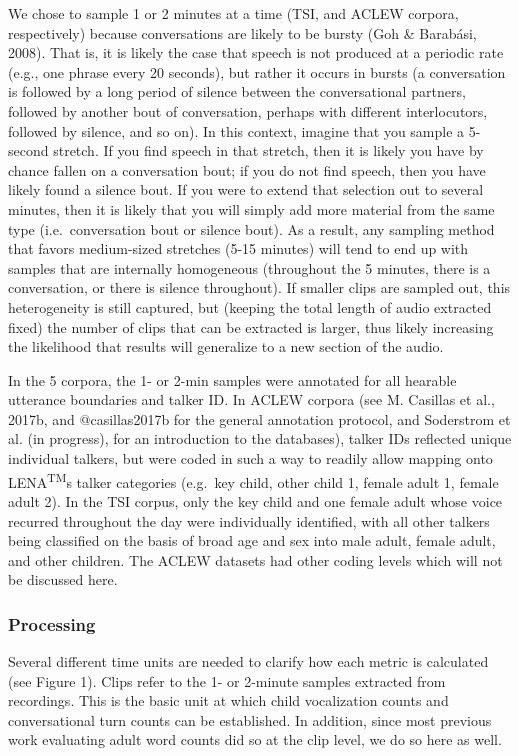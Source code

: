 \documentclass[english,floatsintext,man]{apa6}
\begin{document}
We chose to sample 1 or 2 minutes at a time (TSI, and ACLEW corpora,
respectively) because conversations are likely to be bursty (Goh \&
Barabási, 2008). That is, it is likely the case that speech is not
produced at a periodic rate (e.g., one phrase every 20 seconds), but
rather it occurs in bursts (a conversation is followed by a long period
of silence between the conversational partners, followed by another bout
of conversation, perhaps with different interlocutors, followed by
silence, and so on). In this context, imagine that you sample a 5-second
stretch. If you find speech in that stretch, then it is likely you have
by chance fallen on a conversation bout; if you do not find speech, then
you have likely found a silence bout. If you were to extend that
selection out to several minutes, then it is likely that you will simply
add more material from the same type (i.e.~conversation bout or silence
bout). As a result, any sampling method that favors medium-sized
stretches (5-15 minutes) will tend to end up with samples that are
internally homogeneous (throughout the 5 minutes, there is a
conversation, or there is silence throughout). If smaller clips are
sampled out, this heterogeneity is still captured, but (keeping the
total length of audio extracted fixed) the number of clips that can be
extracted is larger, thus likely increasing the likelihood that results
will generalize to a new section of the audio.

In the 5 corpora, the 1- or 2-min samples were annotated for all
hearable utterance boundaries and talker ID. In ACLEW corpora (see M.
Casillas et al., 2017b, and @casillas2017b for the general annotation
protocol, and Soderstrom et al. (in progress), for an introduction to
the databases), talker IDs reflected unique individual talkers, but were
coded in such a way to readily allow mapping onto
LENA\textsuperscript{TM}s talker categories (e.g.~key child, other child
1, female adult 1, female adult 2). In the TSI corpus, only the key
child and one female adult whose voice recurred throughout the day were
individually identified, with all other talkers being classified on the
basis of broad age and sex into male adult, female adult, and other
children. The ACLEW datasets had other coding levels which will not be
discussed here.

\subsubsection{Processing}\label{processing}

Several different time units are needed to clarify how each metric is
calculated (see Figure 1). Clips refer to the 1- or 2-minute samples
extracted from recordings. This is the basic unit at which child
vocalization counts and conversational turn counts can be established.
In addition, since most previous work evaluating adult word counts did
so at the clip level, we do so here as well.
\end{document}
